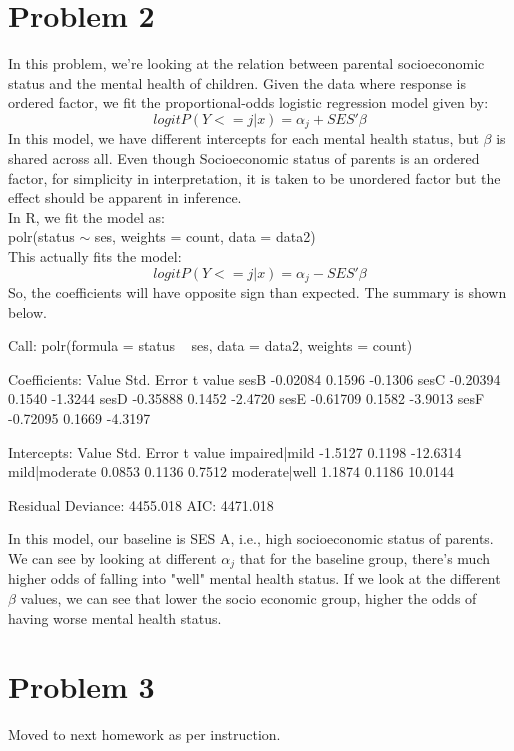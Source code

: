 \documentclass{article}
\begin{document}
\section{Problem 2}
In this problem, we're looking at the relation between parental socioeconomic status and the mental health of children. Given the data where response is ordered factor, we fit the proportional-odds logistic regression model given by:
$$logit P(Y<=j|x) = \alpha_j + SES'\beta$$
In this model, we have different intercepts for each mental health status, but $\beta$ is shared across all. Even though Socioeconomic status of parents is an ordered factor, for simplicity in interpretation, it is taken to be unordered factor but the effect should be apparent in inference.\\
In R, we fit the model as:\\
polr(status $\sim$ ses, weights = count, data = data2)\\


This actually fits the model:\\
$$logit P(Y<=j|x) = \alpha_j - SES'\beta$$
So, the coefficients will have opposite sign than expected. The summary is shown below.\\
\begin{Schunk}
\begin{Soutput}
Call:
polr(formula = status ~ ses, data = data2, weights = count)

Coefficients:
        Value Std. Error t value
sesB -0.02084     0.1596 -0.1306
sesC -0.20394     0.1540 -1.3244
sesD -0.35888     0.1452 -2.4720
sesE -0.61709     0.1582 -3.9013
sesF -0.72095     0.1669 -4.3197

Intercepts:
              Value    Std. Error t value 
impaired|mild  -1.5127   0.1198   -12.6314
mild|moderate   0.0853   0.1136     0.7512
moderate|well   1.1874   0.1186    10.0144

Residual Deviance: 4455.018 
AIC: 4471.018 
\end{Soutput}
\end{Schunk}
In this model, our baseline is SES A, i.e., high socioeconomic status of parents. We can see by looking at different $\alpha_j$ that for the baseline group, there's much higher odds of falling into "well" mental health status. If we look at the different $\beta$ values, we can see that lower the socio economic group, higher the odds of having worse mental health status.\\

\section{Problem 3}
Moved to next homework as per instruction.
\end{document}
